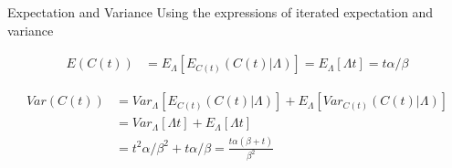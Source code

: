 \documentclass[english]{beamer}\usepackage[]{graphicx}\usepackage[]{xcolor}
\begin{document}
\begin{frame}{Expectation and Variance}
Using the expressions of iterated expectation and variance \citep{held2014applied}

\begin{align*}
E(C(t)) &= E_{\Lambda}[E_{C(t)} (C(t)|\Lambda)] = E_{\Lambda}[\Lambda t] = t\alpha/\beta
\end{align*}

\begin{align*}
Var(C(t)) &= Var_{\Lambda}[E_{C(t)} (C(t)|\Lambda)] + E_{\Lambda}[Var_{C(t)}(C(t)|\Lambda)]\\
&=Var_{\Lambda}[\Lambda t] + E_{\Lambda}[\Lambda t] \\
&=t^2\alpha/\beta^2 + t\alpha/\beta = \frac{t \alpha(\beta+t)}{\beta^2}
\end{align*}
\end{frame}
\end{document}
